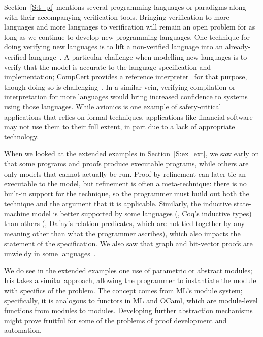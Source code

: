 Section~\ref{S:t_pl} mentions several programming languages or paradigms along
with their accompanying verification tools. Bringing verification to more
languages and more languages to verification will remain an open problem for as
long as we continue to develop new programming languages. One technique for
doing verifying new languages is to lift a non-verified language into an
already-verified language~\cite{leino2008specification}. A particular challenge
when modelling new languages is to verify that the model is accurate to the
language specification and implementation; CompCert provides a reference
interpreter~\cite{Kastner-LBSSF-2017} for that purpose, though doing so is
challenging~\cite[Chs. \emph{Simple Imperative Programs}, \emph{An Evaluation
Function for Imp}]{Pierce:SF1}. In a similar vein, verifying compilation or
interpretation for more languages would bring increased confidence to systems
using those languages. While avionics is one example of safety-critical
applications that relies on formal techniques, applications like financial
software may not use them to their full extent, in part due to a lack of
appropriate technology.

When we looked at the extended examples in Section~\ref{S:ex_ext}, we saw early
on that some programs and proofs produce executable programs, while others are
only models that cannot actually be run. Proof by refinement can later tie an
executable to the model, but refinement is often a meta-technique: there is no
built-in support for the technique, so the programmer must build out both the
technique and the argument that it is applicable. Similarly, the inductive
state-machine model is better supported by some languages (\eg, Coq's inductive
types) than others (\eg, Dafny's relation predicates, which are not tied
together by any meaning other than what the programmer ascribes), which also
impacts the statement of the specification. We also saw that graph and
bit-vector proofs are unwieldy in some languages~\cite{Morrisett_2012}.

We do see in the extended examples one use of parametric or abstract modules;
Iris takes a similar approach, allowing the programmer to instantiate the module
with specifics of the problem. The concept comes from ML's module system;
specifically, it is analogous to functors in ML and OCaml, which are
module-level functions from modules to modules. Developing further abstraction
mechanisms might prove fruitful for some of the problems of proof development
and automation.


